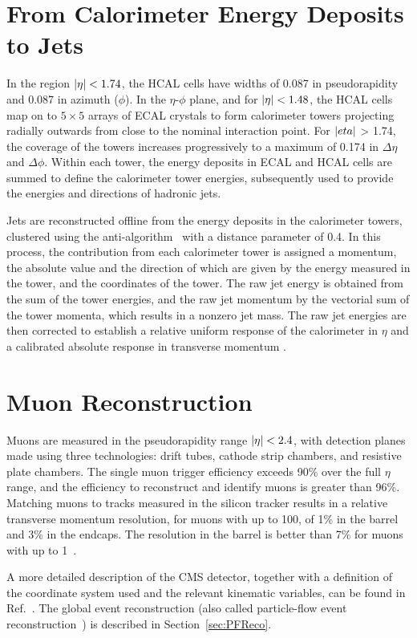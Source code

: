  \section{From Calorimeter Energy Deposits to Jets}\label{sec:CMSDetectorJets}

In the region $\lvert \eta \rvert < 1.74$, the HCAL cells have widths of 0.087 in pseudorapidity and 0.087 in azimuth ($\phi$). In the $\eta$-$\phi$ plane, and for $\lvert \eta \rvert < 1.48$, the HCAL cells map on to $5 \times 5$ arrays of ECAL crystals to form calorimeter towers projecting radially outwards from close to the nominal interaction point. For $\lvert  eta  \rvert$ > 1.74, the coverage of the towers increases progressively to a maximum of 0.174 in $\Delta \eta$ and $\Delta \phi$. Within each tower, the energy deposits in ECAL and HCAL cells are summed to define the calorimeter tower energies, subsequently used to provide the energies and directions of hadronic jets.

Jets are reconstructed offline from the energy deposits in the calorimeter towers, clustered using the anti-\kt algorithm~\cite{Cacciari:2008gp, Cacciari:2011ma} with a distance parameter of 0.4. In this process, the contribution from each calorimeter tower is assigned a momentum, the absolute value and the direction of which are given by the energy measured in the tower, and the coordinates of the tower. The raw jet energy is obtained from the sum of the tower energies, and the raw jet momentum by the vectorial sum of the tower momenta, which results in a nonzero jet mass. The raw jet energies are then corrected to establish a relative uniform response of the calorimeter in $\eta$ and a calibrated absolute response in transverse momentum \pt. 


 \section{Muon Reconstruction}\label{sec:CMSDetectorMuons}


Muons are measured in the pseudorapidity range $\lvert \eta \rvert < 2.4$, with detection planes made using three technologies: drift tubes, cathode strip chambers, and resistive plate chambers. The single muon trigger efficiency exceeds 90\% over the full $\eta$ range, and the efficiency to reconstruct and identify muons is greater than 96\%. Matching muons to tracks measured in the silicon tracker results in a relative transverse momentum resolution, for muons with \pt up to 100\GeV, of 1\% in the barrel and 3\% in the endcaps. The \pt resolution in the barrel is better than 7\% for muons with \pt up to 1\TeV~\cite{Sirunyan:2018fpa}. 


A more detailed description of the CMS detector, together with a definition of the coordinate system used and the relevant kinematic variables, can be found in Ref.~\cite{Chatrchyan:2008zzk}.  The global event reconstruction (also called particle-flow event reconstruction~\cite{CMS-PRF-14-001}) is described in Section~\ref{sec:PFReco}.



